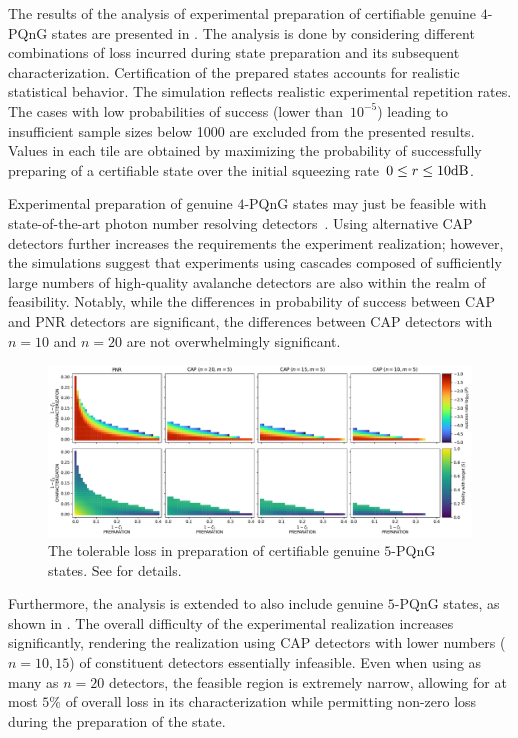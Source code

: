 \documentclass{article}
\begin{document}
The results of the analysis of experimental preparation of certifiable genuine $4$-PQnG states are presented in . The analysis is done by considering different combinations of loss incurred during state preparation and its subsequent characterization. Certification of the prepared states accounts for realistic statistical behavior. The simulation reflects realistic experimental repetition rates. The cases with low probabilities of success (lower than~$10^{-5}$) leading to insufficient sample sizes below 1000 are excluded from the presented results. Values in each tile are obtained by maximizing the probability of successfully preparing of a certifiable state over the initial squeezing rate~${0 \leq r \leq 10\mathrm{dB}}$.

Experimental preparation of genuine $4$-PQnG states may just be feasible with state-of-the-art photon number resolving detectors~\cite{endo2021,endo2024}. Using alternative CAP detectors further increases the requirements  the experiment realization; however, the simulations suggest that experiments using cascades composed of sufficiently large numbers of high-quality avalanche detectors are also within the realm of feasibility. Notably, while the differences in probability of success between CAP and PNR detectors are significant, the differences between CAP detectors with $n = 10$ and $n = 20$ are not overwhelmingly significant.

\begin{figure}[h]
  \begin{center}
    \includegraphics[width = \columnwidth]{import/202411/paper_unified_05.pdf}
  \end{center}
  \caption{
    The tolerable loss in preparation of certifiable genuine $5$-PQnG states. See  for details.
  }
  \label{f-res-5}
\end{figure}

Furthermore, the analysis is extended to also include genuine $5$-PQnG states, as shown in . The overall difficulty of the experimental realization increases significantly, rendering the realization using CAP detectors with lower numbers (${n = 10, 15}$) of constituent detectors essentially infeasible. Even when using as many as $n = 20$ detectors, the feasible region is extremely narrow, allowing for at most $5\%$ of overall loss in its characterization while permitting non-zero loss during the preparation of the state.
\end{document}
